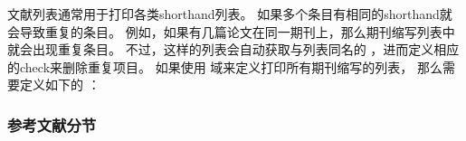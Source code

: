 
文献列表通常用于打印各类shorthand列表。
如果多个条目有相同的shorthand就会导致重复的条目。
例如，如果有几篇论文在同一期刊上，那么期刊缩写列表中就会出现重复条目。
不过，这样的列表会自动获取与列表同名的 ，进而定义相应的check来删除重复项目。
如果使用  域来定义打印所有期刊缩写的列表，
那么需要定义如下的 ：

\begin{ltxexample}
\end{ltxexample}

\subsubsection{参考文献分节}%
\label{use:bib:sec}


